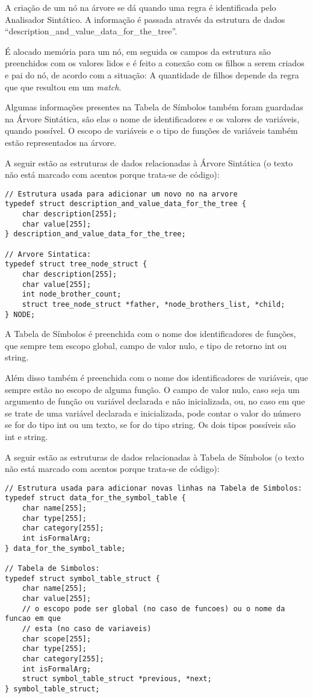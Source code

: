 \documentclass[12pt]{article}
\begin{document}
A criação de um nó na árvore se dá quando uma regra é identificada pelo Analisador Sintático. A informação é passada através da estrutura de dados ``description\_and\_value\_data\_for\_the\_tree''.

É alocado memória para um nó, em seguida os campos da estrutura são preenchidos com os valores lidos e é feito a conexão com os filhos a serem criados e pai do nó, de acordo com a situação: A quantidade de filhos depende da regra que que resultou em um \textit{match}.

Algumas informações presentes na Tabela de Símbolos também foram guardadas na Árvore Sintática, são elas o nome de identificadores e os valores de variáveis, quando possível. O escopo de variáveis e o tipo de funções de variáveis também estão representados na árvore.

A seguir estão as estruturas de dados relacionadas à Árvore Sintática (o texto não está marcado com acentos porque trata-se de código):

\begin{lstlisting}
// Estrutura usada para adicionar um novo no na arvore
typedef struct description_and_value_data_for_the_tree {
    char description[255];
    char value[255];
} description_and_value_data_for_the_tree;

// Arvore Sintatica:
typedef struct tree_node_struct {
    char description[255];
    char value[255];
    int node_brother_count;
    struct tree_node_struct *father, *node_brothers_list, *child;
} NODE;
\end{lstlisting}

A Tabela de Símbolos é preenchida com o nome dos identificadores de funções, que sempre tem escopo global, campo de valor nulo, e tipo de retorno int ou string.

Além disso também é preenchida com o nome dos identificadores de variáveis, que sempre estão no escopo de alguma função. O campo de valor nulo, caso seja um argumento de função ou variável declarada e não inicializada, ou, no caso em que se trate de uma variável declarada e inicializada, pode contar o valor do número se for do tipo int ou um texto, se for do tipo string. Os dois tipos possíveis são int e string.

A seguir estão as estruturas de dados relacionadas à Tabela de Símbolos (o texto não está marcado com acentos porque trata-se de código):

\begin{lstlisting}
// Estrutura usada para adicionar novas linhas na Tabela de Simbolos:
typedef struct data_for_the_symbol_table {
    char name[255];
    char type[255];
    char category[255];
    int isFormalArg;
} data_for_the_symbol_table;

// Tabela de Simbolos:
typedef struct symbol_table_struct {
    char name[255];
    char value[255];
    // o escopo pode ser global (no caso de funcoes) ou o nome da funcao em que
    // esta (no caso de variaveis)
    char scope[255];
    char type[255];
    char category[255];
    int isFormalArg;
    struct symbol_table_struct *previous, *next;
} symbol_table_struct;
\end{lstlisting}
\end{document}
